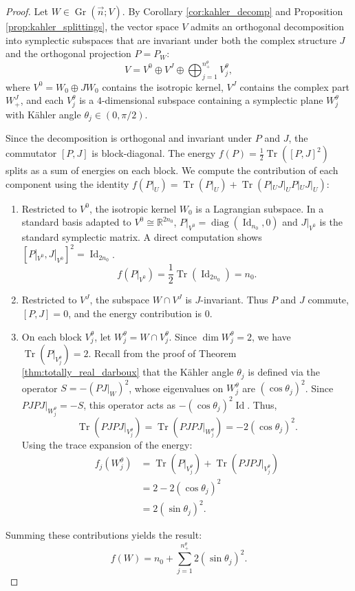 \documentclass[12pt, final]{article}
\def\R{\mathbb{R}}
\def\diag{\operatorname{diag}}
\def\Gr{\operatorname{Gr}}
\def\Tr{\operatorname{Tr}}
\def\Id{\operatorname{Id}}
\begin{document}
\begin{proof}
Let $W \in \Gr(\vec{n}; V)$. By Corollary \ref{cor:kahler_decomp} and Proposition \ref{prop:kahler_splittings}, the vector space $V$ admits an orthogonal decomposition into symplectic subspaces that are invariant under both the complex structure $J$ and the orthogonal projection $P = P_W$:
\[ V = V^0 \oplus V^J \oplus \bigoplus_{j=1}^{n_+^\theta} V_j^\theta, \]
where $V^0 = W_0 \oplus J W_0$ contains the isotropic kernel, $V^J$ contains the complex part $W_+^J$, and each $V_j^\theta$ is a $4$-dimensional subspace containing a symplectic plane $W_j^\theta$ with K\"{a}hler angle $\theta_j \in (0, \pi/2)$.

Since the decomposition is orthogonal and invariant under $P$ and $J$, the commutator $[P, J]$ is block-diagonal. The energy $f(P) = \frac{1}{2} \Tr([P, J]^2)$ splits as a sum of energies on each block. We compute the contribution of each component using the identity $f(P|_U) = \Tr(P|_U) + \Tr(P|_U J|_U P|_U J|_U)$:

\begin{enumerate}
    \item Restricted to $V^0$, the isotropic kernel $W_0$ is a Lagrangian subspace. In a standard basis adapted to $V^0 \cong \R^{2n_0}$, $P|_{V^0} = \diag(\Id_{n_0}, 0)$ and $J|_{V^0}$ is the standard symplectic matrix. A direct computation shows $[P|_{V^0}, J|_{V^0}]^2 = \Id_{2n_0}$.
    \[ f(P|_{V^0}) = \frac{1}{2} \Tr(\Id_{2n_0}) = n_0. \]

    \item Restricted to $V^J$, the subspace $W \cap V^J$ is $J$-invariant. Thus $P$ and $J$ commute, $[P, J] = 0$, and the energy contribution is $0$.

    \item On each block $V_j^\theta$, let $W_j^\theta = W \cap V_j^\theta$. Since $\dim W_j^\theta = 2$, we have $\Tr(P|_{V_j^\theta}) = 2$.
    Recall from the proof of Theorem \ref{thm:totally_real_darboux} that the K\"{a}hler angle $\theta_j$ is defined via the operator $S = -(P J |_W)^2$, whose eigenvalues on $W_j^\theta$ are $(\cos \theta_j)^2$. Since $P J P J |_{W_j^\theta} = -S$, this operator acts as $-(\cos\theta_j)^2 \Id$. Thus,
    \[ \Tr(P J P J |_{V_j^\theta}) = \Tr(P J P J |_{W_j^\theta}) = -2 (\cos \theta_j)^2. \]
    Using the trace expansion of the energy:
    \begin{align*}
        f_j(W_j^\theta) &= \Tr(P|_{V_j^\theta}) + \Tr(PJPJ|_{V_j^\theta}) \\
        &= 2 - 2 (\cos \theta_j)^2 \\
        &= 2( \sin \theta_j)^2.
    \end{align*}
\end{enumerate}

Summing these contributions yields the result:
\[ f(W) = n_0 + \sum_{j=1}^{n_+^\theta} 2 (\sin \theta_j)^2.  \]
\end{proof}
\end{document}
